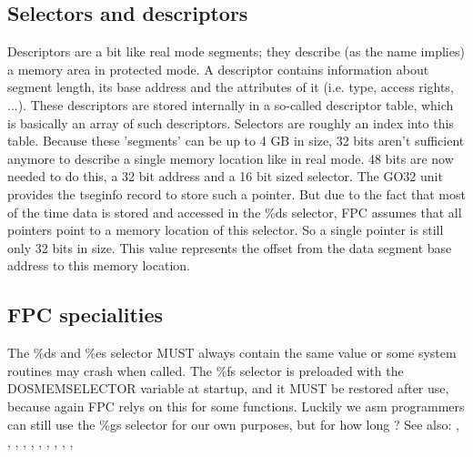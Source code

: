 \subsection{Selectors and descriptors}
Descriptors are a bit like real mode segments; they describe (as the name
implies) a memory area in protected mode. A descriptor contains information
about segment length, its base address and the attributes of it (i.e. type,
access rights, ...).
These descriptors are stored internally in a so-called descriptor table,
which is basically an array of such descriptors.
Selectors are roughly an index into this table.
Because these 'segments' can be up to 4 GB in size, 32 bits aren't
sufficient anymore to describe a single memory location like in real mode.
48 bits are now needed to do this, a 32 bit address and a 16 bit sized
selector. The GO32 unit provides the tseginfo record to store such a
pointer.
But due to the fact that most of the time data is stored and accessed in the
\%ds selector, FPC assumes that all pointers point to a memory location of
this selector. So a single pointer is still only 32 bits in size. This value
represents the offset from the data segment base address to this memory
location.
\subsection{FPC specialities}
The \%ds and \%es selector MUST always contain the same value or some system
routines may crash when called. The \%fs selector is preloaded with the
DOSMEMSELECTOR variable at startup, and it MUST be restored after use,
because again FPC relys on this for some functions. Luckily we asm
programmers can still use the \%gs selector for our own purposes, but for how
long ?
See also:
 , 
 ,
 , 
 ,
 ,
 ,
 ,
 ,
 ,
 ,
